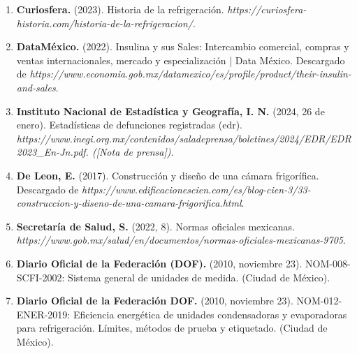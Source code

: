 \documentclass{article}
\begin{document}
\begin{multicols}{2}

\begin{enumerate}[label=\arabic*.]
\setlength\itemsep{1em} %
\item \begin{flushleft} \textbf{Curiosfera.} (2023). Historia de la refrigeración. \textit{https://curiosfera-historia.com/historia-de-la-refrigeracion/}. \end{flushleft}
\item \begin{flushleft} \textbf{DataMéxico.} (2022). Insulina y sus Sales: Intercambio comercial, compras y ventas internacionales, mercado y especialización | Data México. Descargado de \textit{https://www.economia.gob.mx/datamexico/es/profile/product/their-insulin-and-sales}. \end{flushleft}
\item \begin{flushleft} \textbf{Instituto Nacional de Estadística y Geografía, I. N.} (2024, 26 de enero). Estadísticas de defunciones registradas (edr). \textit{https://www.inegi.org.mx/contenidos/saladeprensa/boletines/2024/EDR/EDR2023_En-Jn.pdf. ([Nota de prensa])}. \end{flushleft}
\item \begin{flushleft} \textbf{De Leon, E.} (2017). Construcción y diseño de una cámara frigorífica. Descargado de \textit{https://www.edificacionescien.com/es/blog-cien-3/33-construccion-y-diseno-de-una-camara-frigorifica.html}. \end{flushleft}
\item \begin{flushleft} \textbf{Secretaría de Salud, S.} (2022, 8). Normas oficiales mexicanas. \textit{https://www.gob.mx/salud/en/documentos/normas-oficiales-mexicanas-9705}. \end{flushleft}
\item \begin{flushleft} \textbf{Diario Oficial de la Federación (DOF).} (2010, noviembre 23). NOM-008-SCFI-2002: Sistema general de unidades de medida. (Ciudad de México). \end{flushleft}
\item \begin{flushleft} \textbf{Diario Oficial de la Federación DOF.} (2010, noviembre 23). NOM-012-ENER-2019: Eficiencia energética de unidades condensadoras y evaporadoras para refrigeración. Límites, métodos de prueba y etiquetado. (Ciudad de México). \end{flushleft}

\end{enumerate}
\end{multicols}
\end{document}
